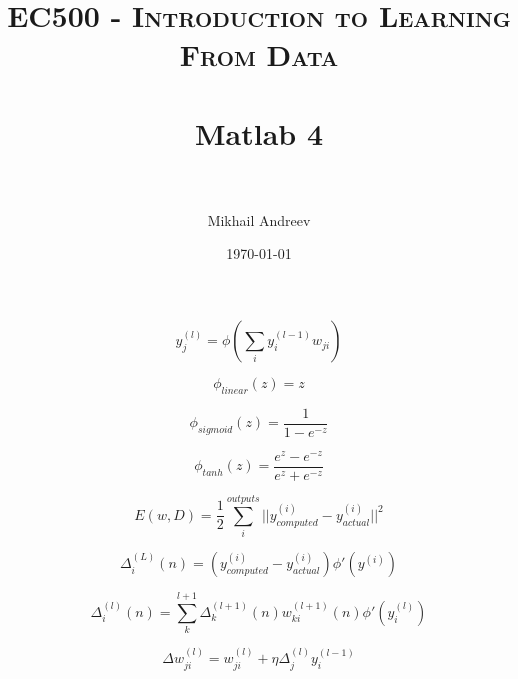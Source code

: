 \documentclass[paper=a4, fontsize=11pt]{scrartcl} %
\title{	
	\normalfont \normalsize 
	\textsc{EC500 - Introduction to Learning From Data} \\ [25pt] %
	\horrule{0.5pt} \\[0.4cm] %
	\huge Matlab 4 \\ %
	\horrule{2pt} \\[0.5cm] %
}
\author{Mikhail Andreev} %
\date{\normalsize\today} %
\numberwithin{equation}{section} %
\numberwithin{figure}{section} %
\numberwithin{table}{section} %
\begin{document}
	
	\maketitle %
	

	\[
	y^{(l)}_j = \phi( \sum_{i} y^{(l-1)}_i w_{ji})
	\]
	
	\[
	\phi_{linear}(z) = z
	\]
	
	\[
	\phi_{sigmoid}(z) = \frac{1}{1-e^{-z}}
	\]
	
	\[
	\phi_{tanh}(z) = \frac{e^{z}-e^{-z}}{e^{z}+e^{-z}}
	\]
	
	\[
	E(w, D) = \frac{1}{2}\sum_i^{outputs}||y_{computed}^{(i)} - y_{actual}^{(i)}||^2
	\]
	
	\[
	\Delta_i^{(L)}(n) = (y_{computed}^{(i)} - y_{actual}^{(i)})\phi'(y^{(i)})
	\]
	
	\[
	\Delta_i^{(l)}(n) =  \sum^{l+1}_k \Delta_k^{(l+1)}(n)w_{ki}^{(l+1)}(n)\phi'(y_i^{(l)})
	\]
	
	\[
	\Delta w_{ji}^{(l)} = w_{ji}^{(l)} + \eta\Delta_j^{(l)}y_i^{(l-1)}
	\]
\end{document}
